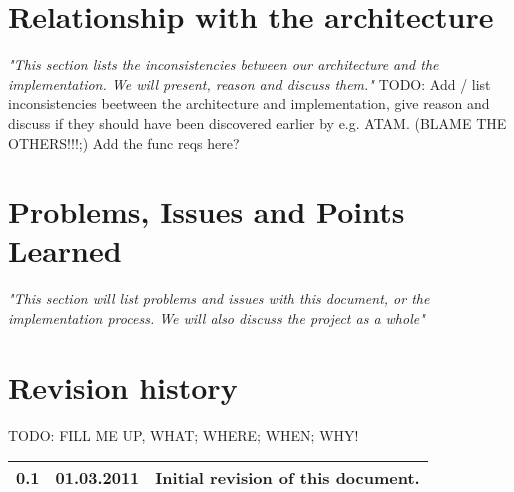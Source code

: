 \documentclass[titlepage,a4paper,11pt]{article}
\begin{document}
\section{Relationship with the architecture}
\emph{"This section lists the inconsistencies between our architecture and the implementation. We will present, reason and discuss them."}
\newpage	
TODO: Add / list inconsistencies beetween the architecture and implementation, give reason and discuss if they should
	have been discovered earlier by e.g. ATAM. (BLAME THE OTHERS!!!;)
	Add the func reqs here?
	

\section{Problems, Issues and Points Learned}
\emph{"This section will list problems and issues with this document, or the implementation process. We will also discuss the project as a whole"}
\newpage
	

\section{Revision history}

TODO: FILL ME UP, WHAT; WHERE; WHEN; WHY!

\begin{table}[H]
  \begin{tabular}{| c | c | c |}
    \hline
    0.1 & 01.03.2011 & Initial revision of this document. \\
    \hline
  \end{tabular}
\end{table}

\printbibliography
\end{document}

